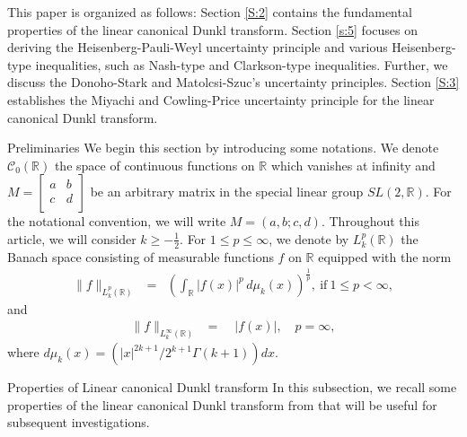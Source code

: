 \documentclass[12pt,a4paper,reqno]{amsproc}
\theoremstyle{definition}
\theoremstyle{remark}
\numberwithin{equation}{section}
\begin{document}
This paper is organized as follows:
Section \ref{S:2} contains the fundamental properties of the linear canonical Dunkl transform. Section \ref{s:5} focuses on deriving the Heisenberg-Pauli-Weyl uncertainty principle and various Heisenberg-type inequalities, such as Nash-type and Clarkson-type inequalities. Further, we discuss the Donoho-Stark and Matolcsi-Szuc’s uncertainty principles. Section \ref{S:3} establishes the Miyachi and Cowling-Price uncertainty principle for the linear canonical Dunkl transform. 
\begin{section}{Preliminaries} \label{S:2}
We begin this section by introducing some notations. We denote $\mathcal{C}_0 (\mathbb{R})$ the space of continuous functions on $\mathbb{R}$ which vanishes at infinity and  $ M = \begin{bmatrix} a & b\\ c & d\\ \end{bmatrix}$ be an arbitrary matrix in  the special linear group $SL(2,\mathbb{R})$. For the notational convention, we will write $M=(a,b;c,d)$.
Throughout this article, we will consider $k\ge - \frac{1}{2}$. For $1\leq p\leq\infty$, we denote by $ L_k^p(\mathbb{R})$ the Banach   space consisting of measurable functions $f$ on $\mathbb{R}$ equipped with the norm 
   \begin{eqnarray*}
    \|f\|_{L_k^p(\mathbb{R})} &=&\left( \int_{\mathbb{R}} |f(x)|^p\,  d\mu_k(x)\right)^{\frac{1}{p}},~ \text{if}~ 1\le p<\infty, 
\end{eqnarray*}
and 
\begin{eqnarray*}
   \|f\|_{L_k^{\infty}(\mathbb{R})} &=& \mathop{\underset{{x\in \mathbb{R}}}{\text{ess.sup}}}|f(x)|, \quad p= \infty, 
\end{eqnarray*}
where $d\mu_k(x) = (|x|^{2k+1}/2^{k+1}\Gamma(k+1))dx.$ 
 
\begin{subsection}{ Properties of Linear 
canonical Dunkl transform}
In this subsection, we recall some properties of the linear canonical Dunkl transform from \cite{ghazouani2017unified} that will be useful for subsequent investigations.


\end{subsection}
\end{section}
\end{document}
